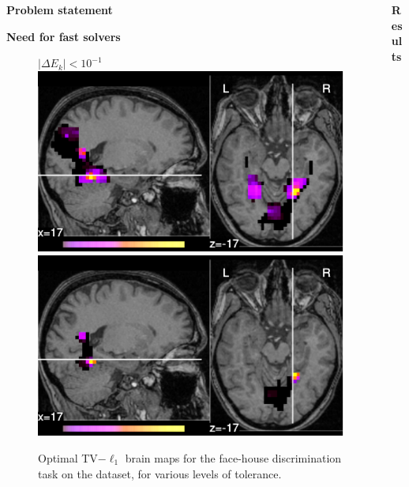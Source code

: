 \documentclass[french]{STIC_poster}
\begin{document}
\begin{frame}[t]
\begin{columns}[t]
\begin{column}{.48\linewidth}
\begin{abox}{\textbf{Problem statement}}
\begin{nbox}[\textwidth]{\textbf{Need for fast solvers}}
\begin{itemize}
\begin{figure}
{{{                                          $|\Delta E_k| < 10^{-1}$}}\hspace*{.32\linewidth}}\hfill%
                                    \includegraphics[width=.32\linewidth]{maps/face_vs_house_tol_0_001.pdf}%
                                    \hfill%
                                    \includegraphics[width=.32\linewidth]{maps/face_vs_house_tol_1e-05.pdf}%
                                    \caption{Optimal TV$-\ell_1$ brain maps for the face-house discrimination task on
                                      the \textcolor{cyan}{\cite{haxby2001}} dataset, for various levels of tolerance. \textcolor{cyan}{\cite{dohmatob2014benchmarking}}}%
                                    \label{fig:maps_tolerance}
                                  \end{figure}
                                  \end{itemize}
                                \end{nbox}
				\end{abox}
			\end{column}
			\hfill
			\begin{column}{.48\linewidth}
			  \begin{abox}{\textbf{Results}}

\end{abox}
\end{column}
\end{columns}
\end{frame}
\end{document}
